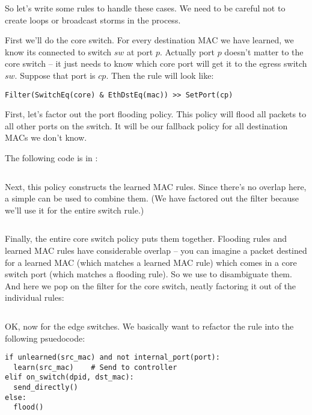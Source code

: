 So let's write some rules to handle these cases.  We need to be careful not to create loops or broadcast
storms in the process.  

First we'll do the core switch.  For every destination MAC we have learned, we know its connected to
switch $sw$ at port $p$.  Actually port $p$ doesn't matter to the core switch -- it just needs to know
which core port will get it to the egress switch $sw$.  Suppose that port is $cp$.  Then the rule will look
like:

\begin{verbatim}
Filter(SwitchEq(core) & EthDstEq(mac)) >> SetPort(cp) 
\end{verbatim}

First, let's factor out the port flooding policy. 
This policy will flood all packets to all other ports on the switch.  
It will be our fallback policy for all destination MACs
we don't know.  

The following code is in :

\inputminted[firstline=22,lastline=32]{python}{code/multiswitch_topologies/multiswitch2.py}

Next, this policy constructs the learned MAC rules.  Since there's no overlap here, a simple
 can be used to combine them.  (We have factored out the  filter
because we'll use it for the entire switch rule.)

\inputminted[firstline=62,lastline=70]{python}{code/multiswitch_topologies/multiswitch2.py}

Finally, the entire core switch policy puts them together.  Flooding rules and learned MAC rules have
considerable overlap -- you can imagine a packet destined for a learned MAC (which matches a learned
MAC rule) which comes in a core switch port (which matches a flooding rule).  So we use 
to disambiguate them.  And here we pop on the filter for the core switch, neatly factoring it out 
of the individual rules:

\inputminted[firstline=72,lastline=80]{python}{code/multiswitch_topologies/multiswitch2.py}

OK, now for the edge switches.  We basically want to refactor the rule into the following psuedocode:

\begin{verbatim}
if unlearned(src_mac) and not internal_port(port):  
  learn(src_mac)    # Send to controller
elif on_switch(dpid, dst_mac):
  send_directly()
else:
  flood()
\end{verbatim}

